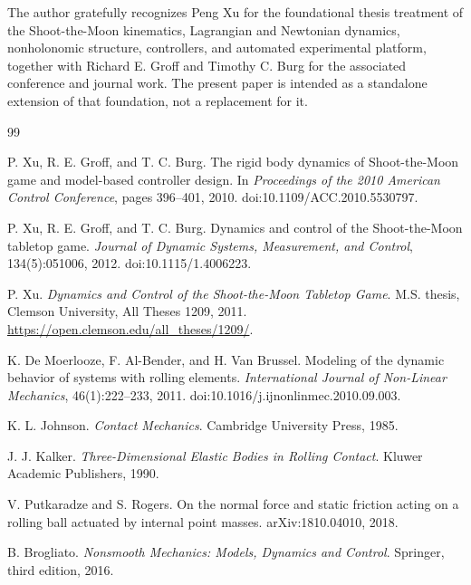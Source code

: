 \documentclass[11pt]{article}
\numberwithin{equation}{section}
\theoremstyle{definition}
\theoremstyle{remark}
\begin{document}
The author gratefully recognizes Peng Xu for the foundational thesis treatment of the Shoot-the-Moon kinematics, Lagrangian and Newtonian dynamics, nonholonomic structure, controllers, and automated experimental platform, together with Richard E. Groff and Timothy C. Burg for the associated conference and journal work.  The present paper is intended as a standalone extension of that foundation, not a replacement for it.

\begin{thebibliography}{99}

P. Xu, R. E. Groff, and T. C. Burg.
\newblock The rigid body dynamics of Shoot-the-Moon game and model-based controller design.
\newblock In \emph{Proceedings of the 2010 American Control Conference}, pages 396--401, 2010.
\newblock doi:10.1109/ACC.2010.5530797.

P. Xu, R. E. Groff, and T. C. Burg.
\newblock Dynamics and control of the Shoot-the-Moon tabletop game.
\newblock \emph{Journal of Dynamic Systems, Measurement, and Control}, 134(5):051006, 2012.
\newblock doi:10.1115/1.4006223.

P. Xu.
\newblock \emph{Dynamics and Control of the Shoot-the-Moon Tabletop Game}.
\newblock M.S. thesis, Clemson University, All Theses 1209, 2011.
\newblock \url{https://open.clemson.edu/all_theses/1209/}.

K. De Moerlooze, F. Al-Bender, and H. Van Brussel.
\newblock Modeling of the dynamic behavior of systems with rolling elements.
\newblock \emph{International Journal of Non-Linear Mechanics}, 46(1):222--233, 2011.
\newblock doi:10.1016/j.ijnonlinmec.2010.09.003.

K. L. Johnson.
\newblock \emph{Contact Mechanics}.
\newblock Cambridge University Press, 1985.

J. J. Kalker.
\newblock \emph{Three-Dimensional Elastic Bodies in Rolling Contact}.
\newblock Kluwer Academic Publishers, 1990.

V. Putkaradze and S. Rogers.
\newblock On the normal force and static friction acting on a rolling ball actuated by internal point masses.
\newblock arXiv:1810.04010, 2018.

B. Brogliato.
\newblock \emph{Nonsmooth Mechanics: Models, Dynamics and Control}.
\newblock Springer, third edition, 2016.


\end{thebibliography}
\end{document}
